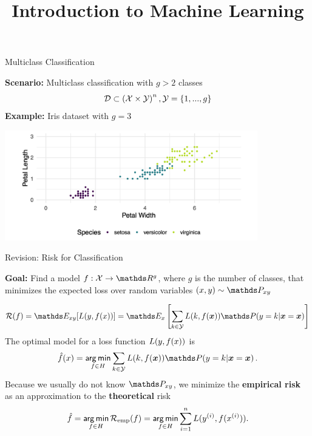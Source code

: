 



\newcommand{\titlefigure}{figure_man/scenario.png}
\newcommand{\learninggoals}{
  \item Know what multiclass means and which types of classifiers exist
  \item Know the MC 0-1-loss
  \item Know the MC brier score
  \item Know the MC logarithmic loss
}

\title{Introduction to Machine Learning}
\date{}





\sloppy 

\begin{vbframe}{Multiclass Classification}

\textbf{Scenario:} Multiclass classification with $g > 2$ classes
$$\mathcal{D} \subset \left(\mathcal{X} \times \mathcal{Y}\right)^n, \mathcal{Y} = \{1, ..., g\}$$ 
\textbf{Example:} Iris dataset with $g = 3$

\vspace*{0.1cm}
\begin{center}
\includegraphics[width = 11cm ]{figure_man/scenario.png}
\end{center}

\end{vbframe}

\begin{vbframe}{Revision: Risk for Classification}

\textbf{Goal:} Find a model  $f: \Xspace \to \R^g$, where $g$ is the number of classes, that minimizes the expected loss over random variables $\xy \sim \Pxy$ 

$$
 \riskf = \E_{xy}[\Lxy] = \E_{x}\left[\sum_{k \in \Yspace} L(k, f(\bm{x})) \P(y = k| \xv = \xv)\right] 
$$
The optimal model for a loss function $L(y, f(x))$ is
$$
  \fxh = \argmin_{f \in \Hspace} \sum_{k \in \Yspace} L(k, f(\bm{x})) \P(y = k| \xv = \xv)\,. $$
Because we usually do not know $\Pxy$, we minimize the \textbf{empirical risk} as an approximation to the \textbf{theoretical} risk
$$
\hat{f} = \mathop{\sf arg\,min}_{f \in H} \mathcal{R}_{\text{emp}}(f) = \mathop{\sf arg\,min}_{f \in H} \sum_{i=1}^n L(y^{(i)}, f(x^{(i)})).
$$
\end{vbframe}


